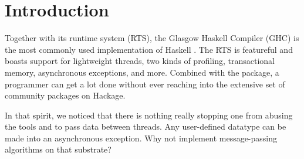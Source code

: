 \documentclass[sigplan,screen]{acmart}
\begin{document}


\maketitle



\section{Introduction}

Together with its runtime system (RTS), the Glasgow Haskell Compiler (GHC) is
the most commonly used implementation of Haskell \cite{fausak2022}.
%
The RTS is featureful and boasts support for lightweight threads, two kinds of
profiling, transactional memory, asynchronous exceptions, and more.
%
Combined with the  package, a programmer can get a lot
done without ever reaching into the extensive set of community packages on
Hackage.

In that spirit,
we noticed that there is nothing really stopping one from
abusing the tools  and 
to pass data between threads.
%
Any user-defined datatype can be made into an asynchronous exception.
%
Why not implement message-passing algorithms on that substrate?
\end{document}
